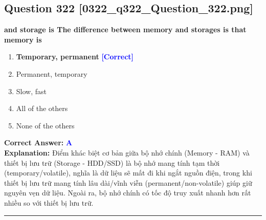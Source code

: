 \documentclass[11pt,a4paper]{article}
\begin{document}
\begin{minipage}{\textwidth}
\subsection*{Question 322 \quad \footnotesize{[0322\_q322\_Question\_322.png]}}
\noindent \textbf{and storage is The difference between memory and storages is that memory is}

\begin{enumerate}[label=\Alph*.]
    \item \textbf{Temporary, permanent} \hfill \textcolor{blue}{\textbf{[Correct]}}
    \item Permanent, temporary
    \item Slow, fast
    \item All of the others
    \item None of the others
\end{enumerate}

\noindent \textbf{Correct Answer:} \textcolor{blue}{\textbf{A}} \\[2pt]
\noindent \textbf{Explanation:} Điểm khác biệt cơ bản giữa bộ nhớ chính (Memory - RAM) và thiết bị lưu trữ (Storage - HDD/SSD) là bộ nhớ mang tính tạm thời (temporary/volatile), nghĩa là dữ liệu sẽ mất đi khi ngắt nguồn điện, trong khi thiết bị lưu trữ mang tính lâu dài/vĩnh viễn (permanent/non-volatile) giúp giữ nguyên vẹn dữ liệu. Ngoài ra, bộ nhớ chính có tốc độ truy xuất nhanh hơn rất nhiều so với thiết bị lưu trữ.

\par\vspace{0.3cm}
\hrule
\vspace{0.3cm}
\end{minipage}
\end{document}
